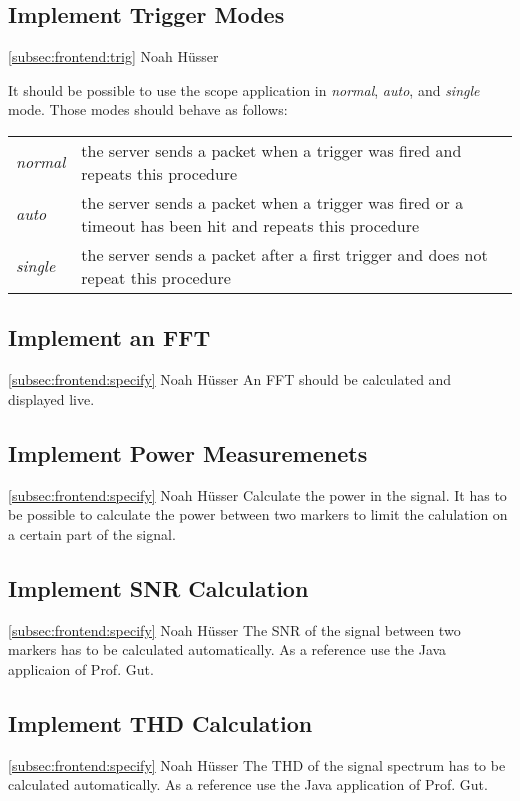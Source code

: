 \documentclass[a4paper,oneside]{alpenspecs/alpenspecs}
\begin{document}
\subsection{Implement Trigger Modes}
\label{subsec:frontend:modes}
\wpac
    {}
    {}
    {}
    {\ref{subsec:frontend:trig}}
    {}
    {Noah Hüsser}
    {%
        It should be possible to use the scope application in \textit{normal}, \textit{auto}, and \textit{single} mode. Those modes should behave as follows:
        \begin{tabular}{l l}
        \textit{normal} & the server sends a packet when a trigger was fired and repeats this procedure \\
        \textit{auto} & the server sends a packet when a trigger was fired or a timeout has been hit and repeats this procedure \\
        \textit{single} & the server sends a packet after a first trigger and does not repeat this procedure
        \end{tabular}
    }

\subsection{Implement an FFT}
\label{subsec:frontend:fft}
\wpac
    {}
    {}
    {}
    {\ref{subsec:frontend:specify}}
    {}
    {Noah Hüsser}
    {%
        An FFT should be calculated and displayed live.
    }

\subsection{Implement Power Measuremenets}
\label{subsec:frontend:}
\wpac
    {}
    {}
    {}
    {\ref{subsec:frontend:specify}}
    {}
    {Noah Hüsser}
    {%
        Calculate the power in the signal.
        It has to be possible to calculate the power between two markers to limit the calulation on a certain part of the signal.
    }

\subsection{Implement SNR Calculation}
\label{subsec:frontend:}
\wpac
    {}
    {}
    {}
    {\ref{subsec:frontend:specify}}
    {}
    {Noah Hüsser}
    {%
        The SNR of the signal between two markers has to be calculated automatically.
        As a reference use the Java applicaion of Prof. Gut.
    }

\subsection{Implement THD Calculation}
\label{subsec:frontend:}
\wpac
    {}
    {}
    {}
    {\ref{subsec:frontend:specify}}
    {}
    {Noah Hüsser}
    {%
        The THD of the signal spectrum has to be calculated automatically.
        As a reference use the Java application of Prof. Gut.
    }
\end{document}
